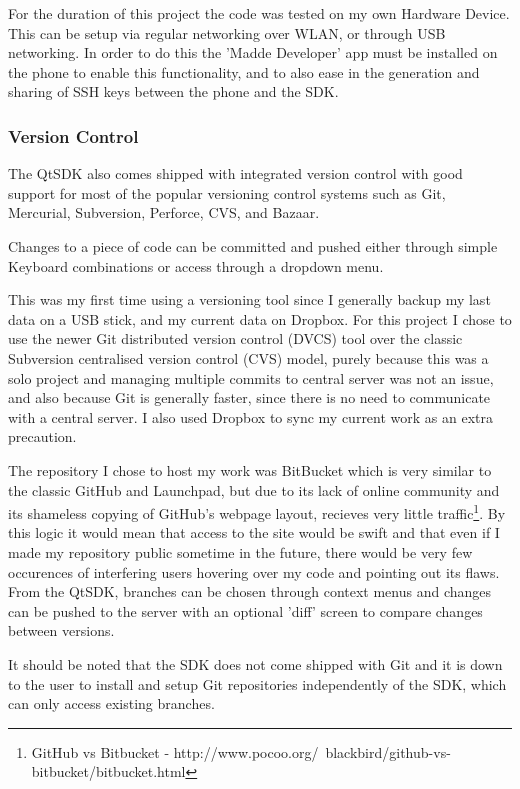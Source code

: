 For the duration of this project the code was tested on my own Hardware Device. This can be setup via regular networking over WLAN, or through USB networking. In order to do this the 'Madde Developer' app must be installed on the phone to enable this functionality, and to also ease in the generation and sharing of SSH keys between the phone and the SDK.

\subsubsection{Version Control}
The QtSDK also comes shipped with integrated version control with good support for most of the popular versioning control systems such as Git, Mercurial, Subversion, Perforce, CVS, and Bazaar.

Changes to a piece of code can be committed and pushed either through simple Keyboard combinations or access through a dropdown menu.

This was my first time using a versioning tool since I generally backup my last data on a USB stick, and my current data on Dropbox.
For this project I chose to use the newer Git distributed version control (DVCS) tool over the classic Subversion centralised version control (CVS) model, purely because this was a solo project and managing multiple commits to central server was not an issue, and also because Git is generally faster, since there is no need to communicate with a central server. I also used Dropbox to sync my current work as an extra precaution.

The repository I chose to host my work was BitBucket which is very similar to the classic GitHub and Launchpad, but due to its lack of online community and its shameless copying of GitHub's webpage layout, recieves very little traffic\footnote{GitHub vs Bitbucket - http://www.pocoo.org/~blackbird/github-vs-bitbucket/bitbucket.html}\label{ref:gitvs}. By this logic it would mean that access to the site would be swift and that even if I made my repository public sometime in the future, there would be very few occurences of interfering users hovering over my code and pointing out its flaws.
From the QtSDK, branches can be chosen through context menus and changes can be pushed to the server with an optional 'diff' screen to compare changes between versions.

It should be noted that the SDK does not come shipped with Git and it is down to the user to install and setup Git repositories independently of the SDK, which can only access existing branches.

